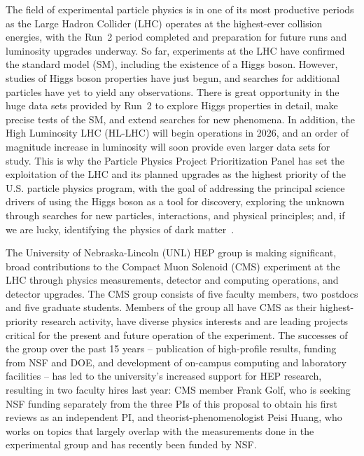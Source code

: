 \noindent
The field of experimental particle physics is in one of its most productive periods as the Large Hadron Collider (LHC) operates at the highest-ever collision energies, with the Run~2 period completed and preparation for future runs and  luminosity upgrades underway.
%
So far, experiments at the LHC have confirmed the standard model (SM), including the existence of a Higgs boson.  However, studies of Higgs boson properties have just begun, and searches for additional particles have yet to yield any observations. There is great opportunity in the huge data sets provided by Run~2 to explore Higgs properties in detail, make precise tests of the SM, and extend searches for new phenomena.  In addition, the High Luminosity LHC (HL-LHC) will begin operations in 2026, and an order of magnitude increase in luminosity will soon provide even larger data sets for study.  This is why the Particle Physics Project Prioritization Panel has set the exploitation of the LHC and its planned upgrades as the highest priority of the U.S. particle physics program, with the goal of addressing the principal science drivers of using the Higgs boson as a tool for discovery, exploring the unknown through searches for new particles, interactions, and physical principles; and, if we are lucky, identifying the physics of dark matter~\cite{bib:P5}.

The University of Nebraska-Lincoln (UNL) HEP group is making significant, broad contributions to the Compact Muon Solenoid (CMS) experiment at the LHC through physics measurements, detector and computing operations, and detector upgrades. The CMS group consists of five faculty members, two postdocs and five graduate students. Members of the group all have CMS as their highest-priority research activity, have diverse physics interests and are leading projects critical for the present and future operation of the experiment.  The successes of the group over the past 15 years -- publication of high-profile results, funding from NSF and DOE, and development of on-campus computing and laboratory facilities -- has led to the university's increased support for HEP research, resulting in two faculty hires last year: CMS member Frank Golf, who is seeking NSF funding separately from the three PIs of this proposal to obtain his first reviews as an independent PI, and theorist-phenomenologist Peisi Huang, who works on topics that largely overlap with the measurements done in the experimental group and has recently been funded by NSF.

